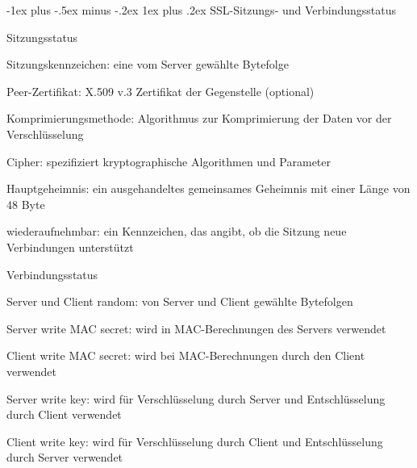 \documentclass[a4paper]{article}
\makeatletter
\renewcommand{\subsubsection}{\@startsection{subsubsection}{3}{0mm}%
 {-1ex plus -.5ex minus -.2ex}%
 {1ex plus .2ex}%
 {\normalfont\small\bfseries}}
\makeatother
\begin{document}
\begin{multicols}{3}
      \subsubsection{SSL-Sitzungs- und Verbindungsstatus}
      \begin{itemize*}
            \item Sitzungsstatus
            \begin{itemize*}
                  \item Sitzungskennzeichen: eine vom Server gewählte Bytefolge
                  \item Peer-Zertifikat: X.509 v.3 Zertifikat der Gegenstelle (optional)
                  \item Komprimierungsmethode: Algorithmus zur Komprimierung der Daten vor der Verschlüsselung
                  \item Cipher: spezifiziert kryptographische Algorithmen und Parameter
                  \item Hauptgeheimnis: ein ausgehandeltes gemeinsames Geheimnis mit einer Länge von 48 Byte
                  \item wiederaufnehmbar: ein Kennzeichen, das angibt, ob die Sitzung neue Verbindungen unterstützt
            \end{itemize*}
            \item Verbindungsstatus
            \begin{itemize*}
                  \item Server und Client random: von Server und Client gewählte Bytefolgen
                  \item Server write MAC secret: wird in MAC-Berechnungen des Servers verwendet
                  \item Client write MAC secret: wird bei MAC-Berechnungen durch den Client verwendet
                  \item Server write key: wird für Verschlüsselung durch Server und Entschlüsselung durch Client verwendet
                  \item Client write key: wird für Verschlüsselung durch Client und Entschlüsselung durch Server verwendet
            \end{itemize*}
      \end{itemize*}


\end{multicols}
\end{document}
